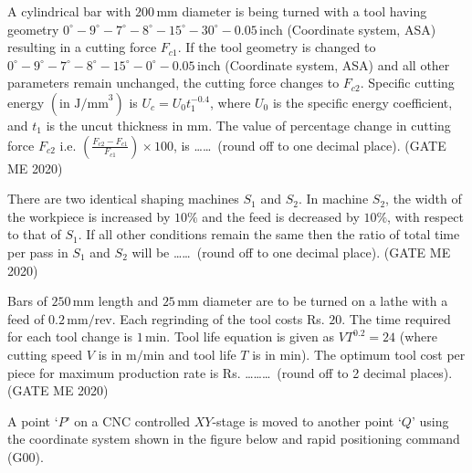 \iffalse
\chapter{2020}
\author{AI24BTECH11030}
\section{me}
\fi
    
\item A cylindrical bar with $200 \, \text{mm}$ diameter is being turned with a tool having geometry $0^\circ - 9^\circ - 7^\circ - 8^\circ - 15^\circ - 30^\circ - 0.05 \, \text{inch}$ (Coordinate system, ASA) resulting in a cutting force $F_{c1}$. If the tool geometry is changed to $0^\circ - 9^\circ - 7^\circ - 8^\circ - 15^\circ - 0^\circ - 0.05 \, \text{inch}$ (Coordinate system, ASA) and all other parameters remain unchanged, the cutting force changes to $F_{c2}$. Specific cutting energy $(\text{in J/mm}^3)$ is $U_c = U_0 t_1^{-0.4}$, where $U_0$ is the specific energy coefficient, and $t_1$ is the uncut thickness in mm. The value of percentage change in cutting force $F_{c2}$ i.e. $\left( \frac{F_{c2} - F_{c1}}{F_{c1}} \right) \times 100$, is \ldots\ldots \ (round off to one decimal place). \hfill (GATE ME 2020)

\item There are two identical shaping machines $S_1$ and $S_2$. In machine $S_2$, the width of the workpiece is increased by $10\%$ and the feed is decreased by $10\%$, with respect to that of $S_1$. If all other conditions remain the same then the ratio of total time per pass in $S_1$ and $S_2$ will be \ldots\ldots \ (round off to one decimal place). \hfill (GATE ME 2020)

\item
Bars of $250 \, \text{mm}$ length and $25 \, \text{mm}$ diameter are to be turned on a lathe with a feed of $0.2 \, \text{mm/rev}$. Each regrinding of the tool costs Rs. $20$. The time required for each tool change is $1 \, \text{min}$. Tool life equation is given as $VT^{0.2} = 24$ (where cutting speed $V$ is in $\text{m/min}$ and tool life $T$ is in $\text{min}$). The optimum tool cost per piece for maximum production rate is Rs. \ldots\ldots\ldots \ (round off to 2 decimal places). \hfill (GATE ME 2020)

\item
A point `$P$' on a CNC controlled $XY$-stage is moved to another point `$Q$' using the coordinate system shown in the figure below and rapid positioning command (G00).

